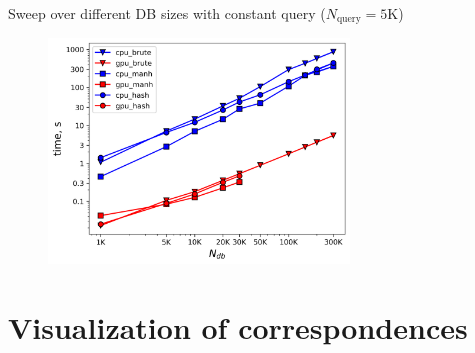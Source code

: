 \documentclass[aspectratio=169]{beamer}
\begin{document}
\begin{frame}{Sweep over different DB sizes with constant query ($N_{\text{query}} = 5\text{K}$)}
\begin{figure}
	\centering
	
	\begin{minipage}{8.0cm}
		
		\includegraphics[width=8.0cm]{log_yx_db.png}
	\end{minipage}
\end{figure}
\begin{itemize}
\end{itemize}
\end{frame}

\section{Visualization of correspondences}
\end{document}
